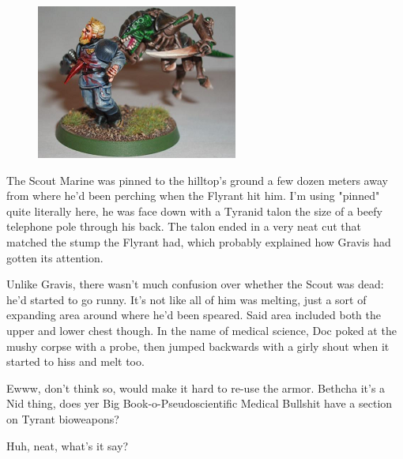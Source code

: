 \begin{figure}
	\begin{center}
		\includegraphics[width=\figwidth]{pics/12/56.png}
	\end{center}
\end{figure}
The Scout Marine was pinned to the hilltop's ground a few dozen meters away from where he'd been perching when the Flyrant hit him. 
I'm using "pinned" quite literally here, he was face down with a Tyranid talon the size of a beefy telephone pole through his back. 
The talon ended in a very neat cut that matched the stump the Flyrant had, which probably explained how Gravis had gotten its attention.

Unlike Gravis, there wasn't much confusion over whether the Scout was dead: 
he'd started to go runny. 
It's not like all of him was melting, just a sort of expanding area around where he'd been speared. 
Said area included both the upper and lower chest though. 
In the name of medical science, Doc poked at the mushy corpse with a probe, then jumped backwards with a girly shout when it started to hiss and melt too.



Ewww, don't think so, would make it hard to re-use the armor. 
Bethcha it's a Nid thing, does yer Big Book-o-Pseudoscientific Medical Bullshit have a section on Tyrant bioweapons?



Huh, neat, what's it say?



